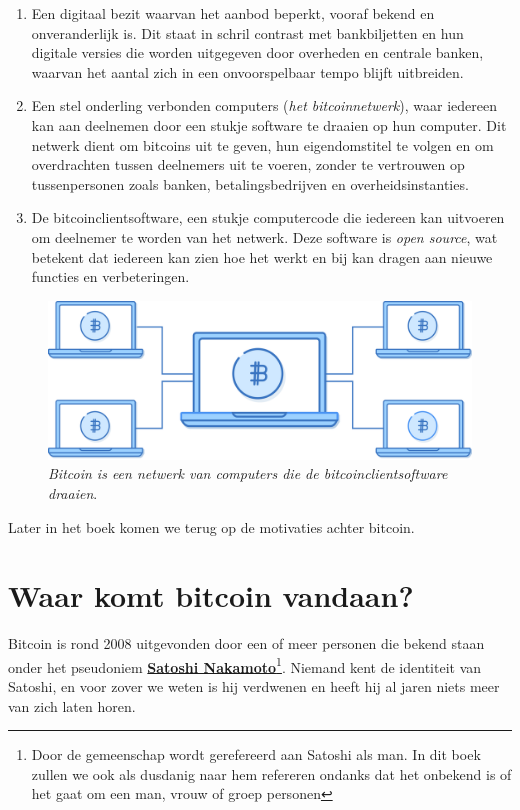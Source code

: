 \begin{enumerate}
    \item Een digitaal bezit waarvan het aanbod beperkt, vooraf bekend en onveranderlijk is. Dit staat in schril contrast met bankbiljetten en hun digitale versies die worden uitgegeven door overheden en centrale banken, waarvan het aantal zich in een onvoorspelbaar tempo blijft uitbreiden.
    \item Een stel onderling verbonden computers (\textit{het bitcoinnetwerk}), waar iedereen kan aan deelnemen door een stukje software te draaien op hun computer. Dit netwerk dient om bitcoins uit te geven, hun eigendomstitel te volgen en om overdrachten tussen deelnemers uit te voeren, zonder te vertrouwen op tussenpersonen zoals banken, betalingsbedrijven en overheidsinstanties.
    \item De bitcoinclientsoftware, een stukje computercode die iedereen kan uitvoeren om deelnemer te worden van het netwerk. Deze software is \textit{open source}, wat betekent dat iedereen kan zien hoe het werkt en bij kan dragen aan nieuwe functies en verbeteringen.

\end{enumerate}
\begin{figure}
    \centering
    \includegraphics[width=\textwidth]{images/fig1.png}
    \caption{\footnotesize{\textit{Bitcoin is een netwerk van computers die de bitcoinclientsoftware draaien}.}}
    \label{fig1}
\end{figure}

\noindent Later in het boek komen we terug op de motivaties achter bitcoin.

\section{Waar komt bitcoin vandaan?}

Bitcoin is rond 2008 uitgevonden door een of meer personen die bekend staan onder het pseudoniem  \href{https://nl.wikipedia.org/wiki/Satoshi_Nakamoto}{\textbf{Satoshi Nakamoto}}\footnote{Door de gemeenschap wordt gerefereerd aan Satoshi als man. In dit boek zullen we ook als dusdanig naar hem refereren ondanks dat het onbekend is of het gaat om een man, vrouw of groep personen}. Niemand kent de identiteit van Satoshi, en voor zover we weten is hij verdwenen en heeft hij al jaren niets meer van zich laten horen.

